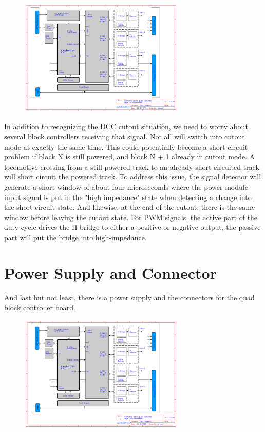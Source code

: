 \begin{figure}[htbp]
    \centering
    \includegraphics[page=6, width=0.7\textwidth]{./Schematics/Schematic_LcsNodes-Block-Quad-Controller.pdf}
\end{figure}
\FloatBarrier

In addition to recognizing the DCC cutout situation, we need to worry about several block controllers receiving that signal. Not all will switch into cutout mode at exactly the same time. This could potentially become a short circuit problem if block N is still powered, and block N + 1 already in cutout mode. A locomotive crossing from a still powered track to an already short circuited track will short circuit the powered track. To address this issue, the signal detector will generate a short window of about four microseconds where the power module input signal is put in the "high impedance" state when detecting a change into the short circuit state. And likewise, at the end of the cutout, there is the same window before leaving the cutout state. For PWM signals, the active part of the duty cycle drives the H-bridge to either a positive or negative output, the passive part will put the bridge into high-impedance.

\section{Power Supply and Connector}

And last but not least, there is a power supply and the connectors for the quad block controller board.

\begin{figure}[htbp]
    \centering
    \includegraphics[page=7, width=0.7\textwidth]{./Schematics/Schematic_LcsNodes-Block-Quad-Controller.pdf}
\end{figure}
\FloatBarrier

